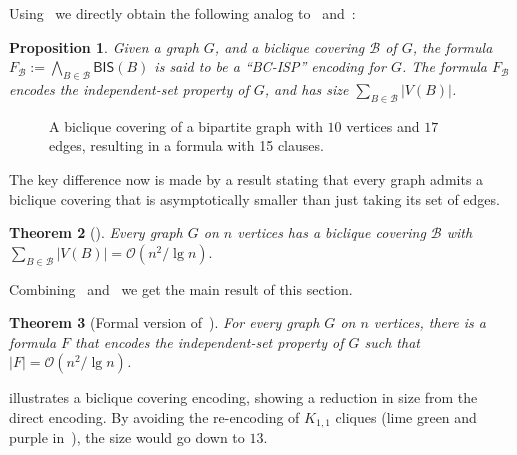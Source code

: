 \documentclass[11pt]{article}
\newtheorem{theorem}{Theorem}
\newtheorem{proposition}[theorem]{Proposition}
\renewcommand{\O}{\mathcal{O}}
\begin{document}
Using~ we directly obtain the following analog to~ and~:
\begin{proposition}\label{prop:biclique_encoding}
     Given a graph $G$, and a biclique covering $\mathcal{B}$ of $G$, the formula 
    \(
        F_\mathcal{B} := \bigwedge_{B \in \mathcal{B}} \textsf{BIS}(B)
    \)
    is said to be a ``BC-ISP'' encoding for $G$. The formula $F_\mathcal{B}$
     encodes the independent-set property of $G$, and has size 
    $\sum_{B \in \mathcal{B}} |V(B)|$.
\end{proposition}


\begin{figure}
\centering

\caption{A biclique covering of a bipartite graph with $10$ vertices and $17$ edges, resulting in a formula with 15 clauses. }\label{fig:biclique_encoding}
\end{figure}

The key difference now is made by a result stating that every graph admits a biclique covering that is asymptotically smaller than just taking its set of edges.
\begin{theorem}[\citet{chungDecompositionGraphsComplete1983}]\label{thm:erdos_chung_spencer}
    Every graph $G$ on $n$ vertices has a biclique covering $\mathcal{B}$ with 
    \(
        \sum_{B \in \mathcal{B}} |V(B)| = \O(n^2 / \lg n).
        \)
\end{theorem}

Combining~ and~ we get the main result of this section.
\begin{theorem}[Formal version of~]\label{thm:subquadratic_encoding}
    For every graph $G$ on $n$ vertices, there is a formula $F$ that encodes the independent-set property of $G$ such that $|F| = \O(n^2 / \lg n)$.
\end{theorem}
 illustrates a biclique covering encoding, showing a reduction in size from the direct encoding. By avoiding the re-encoding of $K_{1, 1}$ cliques (lime green and purple in~), the size would go down to $13$.
\end{document}
